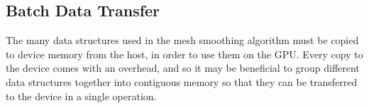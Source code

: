 \subsection*{Batch Data Transfer}
The many data structures used in the mesh smoothing algorithm must be copied to device memory from the host, in order to use them on the GPU. Every copy to the device comes with an overhead\cite{transfer}, and so it may be beneficial to group different data structures together into contiguous memory so that they can be transferred to the device in a single operation.